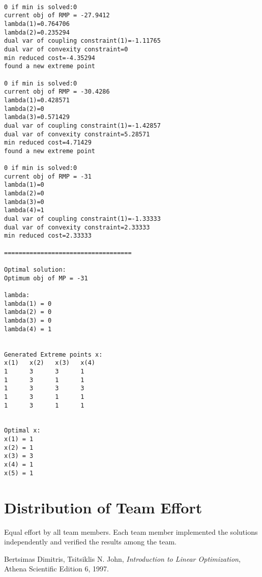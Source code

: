 \documentclass[twoside,12pt]{article}
\begin{document}
\begin{verbatim}

0 if min is solved:0
current obj of RMP = -27.9412
lambda(1)=0.764706
lambda(2)=0.235294
dual var of coupling constraint(1)=-1.11765
dual var of convexity constraint=0
min reduced cost=-4.35294
found a new extreme point

0 if min is solved:0
current obj of RMP = -30.4286
lambda(1)=0.428571
lambda(2)=0
lambda(3)=0.571429
dual var of coupling constraint(1)=-1.42857
dual var of convexity constraint=5.28571
min reduced cost=4.71429
found a new extreme point

0 if min is solved:0
current obj of RMP = -31
lambda(1)=0
lambda(2)=0
lambda(3)=0
lambda(4)=1
dual var of coupling constraint(1)=-1.33333
dual var of convexity constraint=2.33333
min reduced cost=2.33333

===================================

Optimal solution:
Optimum obj of MP = -31

lambda:
lambda(1) = 0
lambda(2) = 0
lambda(3) = 0
lambda(4) = 1


Generated Extreme points x:
x(1)   x(2)   x(3)   x(4)   
1      3      3      1      
1      3      1      1      
1      3      3      3      
1      3      1      1      
1      3      1      1      


Optimal x:
x(1) = 1
x(2) = 1
x(3) = 3
x(4) = 1
x(5) = 1
\end{verbatim}

\section{Distribution of Team Effort}
Equal effort by all team members. Each team member implemented the solutions independently and verified the results among the team.



\begin{thebibliography}{9}

  Bertsimas Dimitris, Tsitsiklis N. John,
  \emph{Introduction to Linear Optimization},
  Athena Scientific Edition 6,
  1997.

\end{thebibliography}
\end{document}
